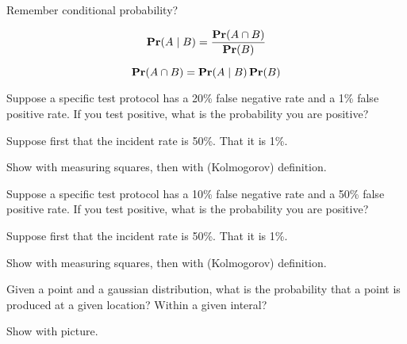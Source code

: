 




Remember conditional probability?

\begin{defn}[Kolmogorov]
  \begin{displaymath}
    \mathbf{Pr}(A\mid B) = \frac{\mathbf{Pr}(A\cap B)}{\mathbf{Pr}(B)}
  \end{displaymath}
\end{defn}

\begin{defn}[axiom]
  \begin{displaymath}
    \mathbf{Pr}(A\cap B) = \mathbf{Pr}(A\mid B) \, \mathbf{Pr}(B)
  \end{displaymath}
\end{defn}

\begin{example}
  Suppose a specific test protocol has a 20\% false negative rate and
  a 1\% false positive rate.  If you test positive, what is the
  probability you are positive?

  Suppose first that the incident rate is 50\%.  That it is 1\%.
\end{example}

\begin{soln}
    Show with measuring squares, then with (Kolmogorov) definition.
\end{soln}

\begin{example}
  Suppose a specific test protocol has a 10\% false negative rate and
  a 50\% false positive rate.  If you test positive, what is the
  probability you are positive?

  Suppose first that the incident rate is 50\%.  That it is 1\%.
\end{example}

\begin{soln}
  Show with measuring squares, then with (Kolmogorov) definition.
\end{soln}

\begin{example}
  Given a point and a gaussian distribution, what is the probability
  that a point is produced at a given location?  Within a given interal?
\end{example}

\begin{soln}
  Show with picture.
\end{soln}

